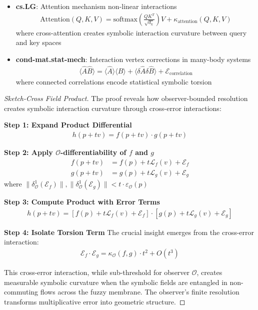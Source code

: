 \begin{theorem}
\begin{itemize}
\item \textbf{cs.LG}: Attention mechanism non-linear interactions
  \begin{align}
  \text{Attention}(Q, K, V) = \text{softmax}\left(\frac{QK^T}{\sqrt{d_k}}\right)V + \kappa_{\text{attention}}(Q, K, V)
  \end{align}
  where cross-attention creates symbolic interaction curvature between query and key spaces
  
\item \textbf{cond-mat.stat-mech}: Interaction vertex corrections in many-body systems
  \begin{align}
  \langle \hat{A} \hat{B} \rangle = \langle \hat{A} \rangle \langle \hat{B} \rangle + \langle \delta\hat{A} \delta\hat{B} \rangle + \mathcal{E}_{\text{correlation}}
  \end{align}
  where connected correlations encode statistical symbolic torsion
\end{itemize}
\end{theorem}

\begin{proof}[Sketch-Cross Field Product]
\label{proof:bk4_sketch_cross_field_product}
The proof reveals how observer-bounded resolution creates symbolic interaction curvature through cross-error interactions:

\textbf{Step 1: Expand Product Differential}
\begin{align}
h(p + tv) = f(p + tv) \cdot g(p + tv)
\end{align}

\textbf{Step 2: Apply $\mathcal{O}$-differentiability of $f$ and $g$}
\begin{align}
f(p + tv) &= f(p) + t\mathcal{L}_f(v) + \mathcal{E}_f \\
g(p + tv) &= g(p) + t\mathcal{L}_g(v) + \mathcal{E}_g
\end{align}
where $\|\delta^1_{\mathcal{O}}(\mathcal{E}_f)\|, \|\delta^1_{\mathcal{O}}(\mathcal{E}_g)\| < t \cdot \varepsilon_{\mathcal{O}}(p)$

\textbf{Step 3: Compute Product with Error Terms}
\begin{align}
h(p + tv) = [f(p) + t\mathcal{L}_f(v) + \mathcal{E}_f] \cdot [g(p) + t\mathcal{L}_g(v) + \mathcal{E}_g]
\end{align}

\textbf{Step 4: Isolate Torsion Term}
The crucial insight emerges from the cross-error interaction:
\begin{align}
\mathcal{E}_f \cdot \mathcal{E}_g = \kappa_{\mathcal{O}}(f, g) \cdot t^2 + O(t^3)
\end{align}

This cross-error interaction, while sub-threshold for observer $\mathcal{O}$, creates measurable symbolic curvature when the symbolic fields are entangled in non-commuting flows across the fuzzy membrane. The observer's finite resolution transforms multiplicative error into geometric structure.
\end{proof}

